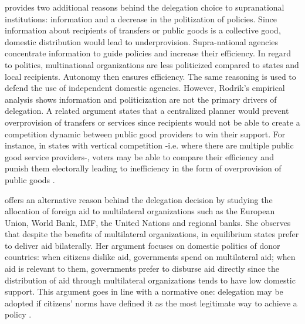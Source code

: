 \documentclass[12pt]{amsart}
\numberwithin{equation}{section}
\theoremstyle{definition}
\theoremstyle{definition}
\theoremstyle{definition}
\begin{document}
\citet{Rodrick_1996} provides two additional reasons behind the delegation choice to supranational institutions: information and a decrease in the politization of policies. Since information about recipients of transfers or public goods is a collective good, domestic distribution would lead to underprovision. Supra-national agencies concentrate information to guide policies and increase their efficiency. In regard to politics, multinational organizations are less politicized compared to states and local recipients. Autonomy then ensures efficiency. The same reasoning is used to defend the use of independent domestic agencies. However, Rodrik’s empirical analysis shows information and politicization are not the primary drivers of delegation. A related argument states that a centralized planner would prevent overprovision of transfers or services since recipients would not be able to create a competition dynamic between public good providers to win their support. For instance, in states with vertical competition -i.e. where there are multiple public good service providers-, voters may be able to compare their efficiency and punish them electorally leading to inefficiency in the form of overprovision of public goods \citep{salmon_1987, Breton_1996}.

\citet{milner_2004} offers an alternative reason behind the delegation decision by studying the allocation of foreign aid to multilateral organizations such as the European Union, World Bank, IMF, the United Nations and regional banks. She observes that despite the benefits of multilateral organizations, in equilibrium states prefer to deliver aid bilaterally. Her argument focuses on domestic politics of donor countries: when citizens dislike aid, governments spend on multilateral aid; when aid is relevant to them, governments prefer to disburse aid directly since the distribution of aid through multilateral organizations tends to have low domestic support. This argument goes in line with a normative one: delegation may be adopted if citizens’ norms have defined it as the most legitimate way to achieve a policy \citep{finnemore_1996, ruggie_1993, milner_2011}.
\end{document}
